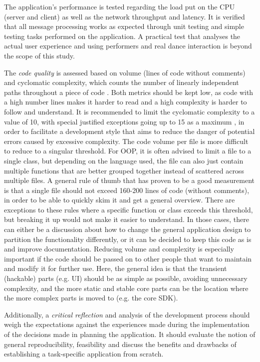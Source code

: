 The application's performance is tested regarding the load put on the \ac{CPU} (server and client) as well as the network throughput and latency.
It is verified that all message processing works as expected through unit testing and simple testing tasks performed on the application.
A practical test that analyses the actual user experience and using performers and real dance interaction is beyond the scope of this study.

The \emph{code quality} is assessed based on volume (lines of code without comments) and cyclomatic complexity, which counts the number of linearly independent paths throughout a piece of code \parencite[see][]{mcCabeComplexity}.
Both metrics should be kept low, as code with a high number lines makes it harder to read and a high complexity is harder to follow and understand.
It is recommended to limit the cyclomatic complexity to a value of 10, with special justified exceptions going up to 15 as a maximum \parencite[15]{testingCyclomaticComplexity}, in order to facilitate a development style that aims to reduce the danger of potential errors caused by excessive complexity.
The code volume per file is more difficult to reduce to a singular threshold.
For \ac{OOP}, it is often advised to limit a file to a single class, but depending on the language used, the file can also just contain multiple functions that are better grouped together instead of scattered across multiple files.
A general rule of thumb that has proven to be a good measurement is that a single file should not exceed 160-200 lines of code (without comments), in order to be able to quickly skim it and get a general overview.
There are exceptions to these rules where a specific function or class exceeds this threshold, but breaking it up would not make it easier to understand. In those cases, there can either be a discussion about how to change the general application design to partition the functionality differently, or it can be decided to keep this code as is and improve documentation.
Reducing volume and complexity is especially important if the code should be passed on to other people that want to maintain and modify it for further use. Here, the general idea is that the transient (hackable) parts (e.g. \ac{UI}) should be as simple as possible, avoiding unnecessary complexity, and the more static and stable core parts can be the location where the more complex parts is moved to (e.g. the core \ac{SDK}).

Additionally, a \emph{critical reflection} and analysis of the development process should weigh the expectations against the experiences made during the implementation of the decisions made in planning the application.
It should evaluate the notion of general reproducibility, feasibility and discuss the benefits and drawbacks of establishing a task-specific application from scratch.

